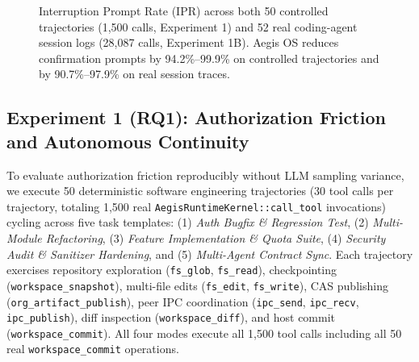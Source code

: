 \documentclass[acmsmall,screen,review]{acmart}
\begin{document}
\begin{figure}[!t]
{\begin{tikzpicture}[font=\sffamily\scriptsize]
\end{tikzpicture}%
}
\caption{Interruption Prompt Rate (IPR) across both 50 controlled trajectories (1,500 calls, Experiment 1) and 52 real coding-agent session logs (28,087 calls, Experiment 1B). Aegis OS reduces confirmation prompts by 94.2\%--99.9\% on controlled trajectories and by 90.7\%--97.9\% on real session traces.}
\label{fig:exp1}
\end{figure}

\subsection{Experiment 1 (RQ1): Authorization Friction and Autonomous Continuity}

To evaluate authorization friction reproducibly without LLM sampling variance, we execute 50 deterministic software engineering trajectories (30 tool calls per trajectory, totaling 1,500 real \texttt{AegisRuntimeKernel::call\_tool} invocations) cycling across five task templates: (1) \emph{Auth Bugfix \& Regression Test}, (2) \emph{Multi-Module Refactoring}, (3) \emph{Feature Implementation \& Quota Suite}, (4) \emph{Security Audit \& Sanitizer Hardening}, and (5) \emph{Multi-Agent Contract Sync}. Each trajectory exercises repository exploration (\texttt{fs\_glob}, \texttt{fs\_read}), checkpointing (\texttt{workspace\_snapshot}), multi-file edits (\texttt{fs\_edit}, \texttt{fs\_write}), CAS publishing (\texttt{org\_artifact\_publish}), peer IPC coordination (\texttt{ipc\_send}, \texttt{ipc\_recv}, \texttt{ipc\_publish}), diff inspection (\texttt{workspace\_diff}), and host commit (\texttt{workspace\_commit}). All four modes execute all 1,500 tool calls including all 50 real \texttt{workspace\_commit} operations.
\end{document}
